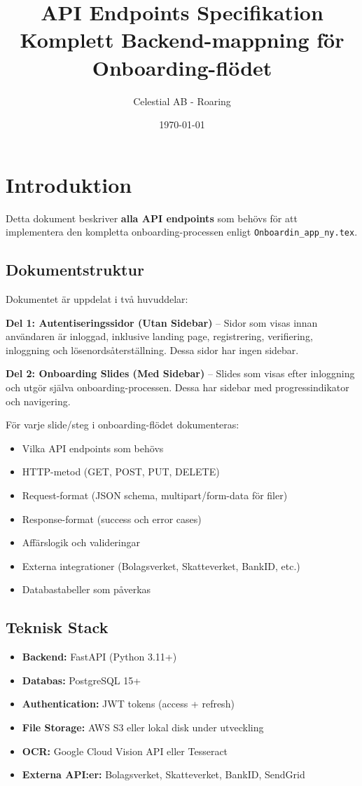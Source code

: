 \documentclass[12pt,a4paper]{article}
\title{\textbf{API Endpoints Specifikation} \\ \large Komplett Backend-mappning för Onboarding-flödet}
\author{Celestial AB - Roaring}
\date{\today}
\begin{document}
\maketitle
\tableofcontents
\newpage

\section{Introduktion}

Detta dokument beskriver \textbf{alla API endpoints} som behövs för att implementera den kompletta onboarding-processen enligt \texttt{Onboardin\_app\_ny.tex}.

\subsection{Dokumentstruktur}

Dokumentet är uppdelat i två huvuddelar:

\textbf{Del 1: Autentiseringssidor (Utan Sidebar)} -- Sidor som visas innan användaren är inloggad, inklusive landing page, registrering, verifiering, inloggning och lösenordsåterställning. Dessa sidor har ingen sidebar.

\textbf{Del 2: Onboarding Slides (Med Sidebar)} -- Slides som visas efter inloggning och utgör själva onboarding-processen. Dessa har sidebar med progressindikator och navigering.

För varje slide/steg i onboarding-flödet dokumenteras:
\begin{itemize}[noitemsep]
  \item Vilka API endpoints som behövs
  \item HTTP-metod (GET, POST, PUT, DELETE)
  \item Request-format (JSON schema, multipart/form-data för filer)
  \item Response-format (success och error cases)
  \item Affärslogik och valideringar
  \item Externa integrationer (Bolagsverket, Skatteverket, BankID, etc.)
  \item Databastabeller som påverkas
\end{itemize}

\subsection{Teknisk Stack}
\begin{itemize}[noitemsep]
  \item \textbf{Backend:} FastAPI (Python 3.11+)
  \item \textbf{Databas:} PostgreSQL 15+
  \item \textbf{Authentication:} JWT tokens (access + refresh)
  \item \textbf{File Storage:} AWS S3 eller lokal disk under utveckling
  \item \textbf{OCR:} Google Cloud Vision API eller Tesseract
  \item \textbf{Externa API:er:} Bolagsverket, Skatteverket, BankID, SendGrid
\end{itemize}
\end{document}
